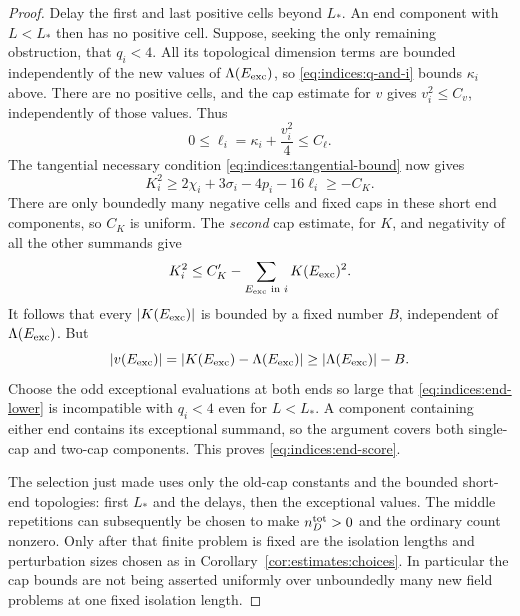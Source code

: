 \begin{proof}
Delay the first and last positive cells beyond $L_*$.  An end component
with $L<L_*$ then has no positive cell.  Suppose, seeking the only
remaining obstruction, that $q_i<4$.  All its topological dimension terms
are bounded independently of the new values of $\Lambda(E_{\rm exc})$,
so \eqref{eq:indices:q-and-i} bounds $\kappa_i$ above.  There are no
positive cells, and the cap estimate for $v$ gives $v_i^2\le C_v$,
independently of those values.  Thus
\[
 0\le\ell_i=\kappa_i+\frac{v_i^2}{4}\le C_\ell.
\]
The tangential necessary condition
\eqref{eq:indices:tangential-bound} now gives
\[
 K_i^2\ge2\chi_i+3\sigma_i-4p_i-16\ell_i\ge-C_K.
\]
There are only boundedly many negative cells and fixed caps in these
short end components, so $C_K$ is uniform.  The \emph{second} cap estimate,
for $K$, and negativity of all the other summands give
\[
 K_i^2\le C'_K-\sum_{E_{\rm exc}\text{ in }i}K(E_{\rm exc})^2.
\]
It follows that every $|K(E_{\rm exc})|$ is bounded by a fixed number $B$,
independent of $\Lambda(E_{\rm exc})$.  But
\[
 |v(E_{\rm exc})|
 =|K(E_{\rm exc})-\Lambda(E_{\rm exc})|
 \ge|\Lambda(E_{\rm exc})|-B.
\]
Choose the odd exceptional evaluations at both ends so large that
\eqref{eq:indices:end-lower} is incompatible with $q_i<4$ even for
$L<L_*$.  A component containing either end contains its exceptional
summand, so the argument covers both single-cap and two-cap components.
This proves \eqref{eq:indices:end-score}.

The selection just made uses only the old-cap constants and the bounded
short-end topologies: first $L_*$ and the delays, then the exceptional
values.  The middle repetitions can subsequently be chosen to make
$n_D^{\rm tot}>0$ and the ordinary count nonzero.  Only after that finite
problem is fixed are the isolation lengths and perturbation sizes chosen
as in Corollary~\ref{cor:estimates:choices}.  In particular the cap bounds
are not being asserted uniformly over unboundedly many new field
problems at one fixed isolation length.
\end{proof}

